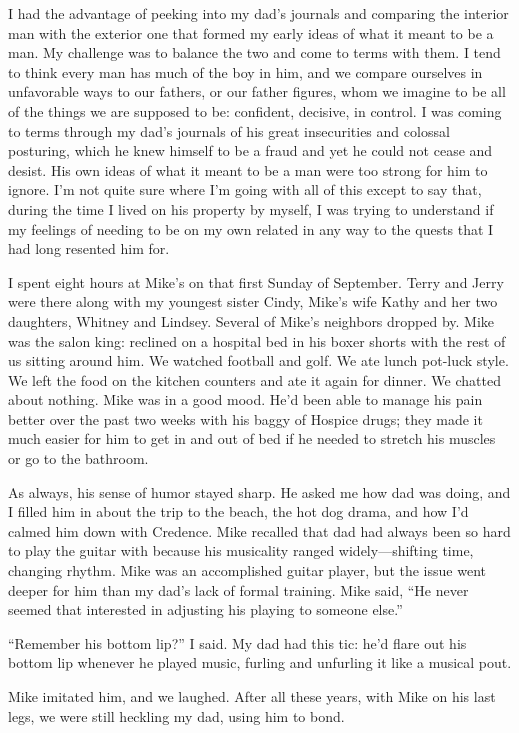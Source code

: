 \documentclass[12pt]{book}
\begin{document}
I had the advantage of peeking into my dad's journals and comparing the interior man with the exterior one that formed my early ideas of what it meant to be a man. My challenge was to balance the two and come to terms with them. I tend to think every man has much of the boy in him, and we compare ourselves in unfavorable ways to our fathers, or our father figures, whom we imagine to be all of the things we are supposed to be: confident, decisive, in control. I was coming to terms through my dad's journals of his great insecurities and colossal posturing, which he knew himself to be a fraud and yet he could not cease and desist. His own ideas of what it meant to be a man were too strong for him to ignore. I'm not quite sure where I'm going with all of this except to say that, during the time I lived on his property by myself, I was trying to understand if my feelings of needing to be on my own related in any way to the quests that I had long resented him for.

I spent eight hours at Mike's on that first Sunday of September. Terry and Jerry were there along with my youngest sister Cindy, Mike's wife Kathy and her two daughters, Whitney and Lindsey. Several of Mike's neighbors dropped by. Mike was the salon king: reclined on a hospital bed in his boxer shorts with the rest of us sitting around him. We watched football and golf. We ate lunch pot-luck style. We left the food on the kitchen counters and ate it again for dinner. We chatted about nothing. Mike was in a good mood. He'd been able to manage his pain better over the past two weeks with his baggy of Hospice drugs; they made it much easier for him to get in and out of bed if he needed to stretch his muscles or go to the bathroom.

As always, his sense of humor stayed sharp. He asked me how dad was doing, and I filled him in about the trip to the beach, the hot dog drama, and how I'd calmed him down with Credence. Mike recalled that dad had always been so hard to play the guitar with because his musicality ranged widely---shifting time, changing rhythm. Mike was an accomplished guitar player, but the issue went deeper for him than my dad's lack of formal training. Mike said, ``He never seemed that interested in adjusting his playing to someone else.''

``Remember his bottom lip?'' I said. My dad had this tic: he'd flare out his bottom lip whenever he played music, furling and unfurling it like a musical pout.

Mike imitated him, and we laughed. After all these years, with Mike on his last legs, we were still heckling my dad, using him to bond.
\end{document}
